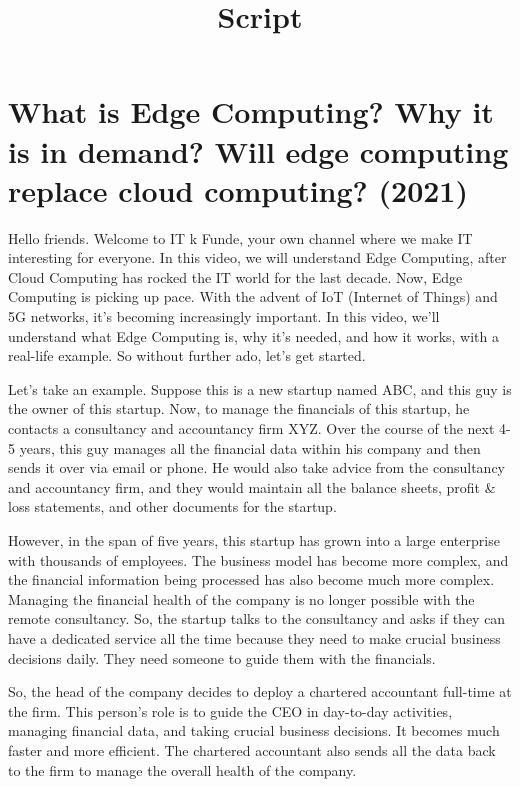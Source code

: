 \documentclass{article}
\title{Script}
\author{}
\date{}
\begin{document}
\maketitle

\section{What is Edge Computing? Why it is in demand? Will edge computing replace cloud computing? (2021)
}


Hello friends. Welcome to IT k Funde, your own channel where we make IT interesting for everyone. In this video, we will understand Edge Computing, after Cloud Computing has rocked the IT world for the last decade. Now, Edge Computing is picking up pace. With the advent of IoT (Internet of Things) and 5G networks, it's becoming increasingly important. In this video, we'll understand what Edge Computing is, why it's needed, and how it works, with a real-life example. So without further ado, let's get started.

Let's take an example. Suppose this is a new startup named ABC, and this guy is the owner of this startup. Now, to manage the financials of this startup, he contacts a consultancy and accountancy firm XYZ. Over the course of the next 4-5 years, this guy manages all the financial data within his company and then sends it over via email or phone. He would also take advice from the consultancy and accountancy firm, and they would maintain all the balance sheets, profit & loss statements, and other documents for the startup.

However, in the span of five years, this startup has grown into a large enterprise with thousands of employees. The business model has become more complex, and the financial information being processed has also become much more complex. Managing the financial health of the company is no longer possible with the remote consultancy. So, the startup talks to the consultancy and asks if they can have a dedicated service all the time because they need to make crucial business decisions daily. They need someone to guide them with the financials.

So, the head of the company decides to deploy a chartered accountant full-time at the firm. This person’s role is to guide the CEO in day-to-day activities, managing financial data, and taking crucial business decisions. It becomes much faster and more efficient. The chartered accountant also sends all the data back to the firm to manage the overall health of the company.
\end{document}
